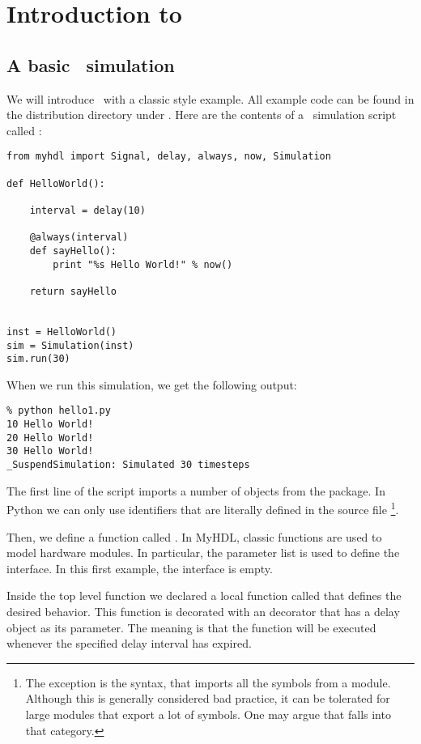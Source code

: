 \chapter{Introduction to \myhdl\ \label{intro}}

\section{A basic \myhdl\ simulation \label{intro-basic}}

We will introduce \myhdl\ with a classic  style
example. All example code can be found in the distribution directory
under .  Here are the contents of a \myhdl\
simulation script called :

\begin{verbatim}
from myhdl import Signal, delay, always, now, Simulation

def HelloWorld():

    interval = delay(10)
    
    @always(interval)
    def sayHello():
        print "%s Hello World!" % now()

    return sayHello


inst = HelloWorld()
sim = Simulation(inst)
sim.run(30)
\end{verbatim}

When we run this simulation, we get the following output:

\begin{verbatim}
% python hello1.py
10 Hello World!
20 Hello World!
30 Hello World!
_SuspendSimulation: Simulated 30 timesteps
\end{verbatim}

The first line of the script imports a number of objects from the
\code{myhdl} package. In Python we can only use identifiers that are
literally defined in the source file 
\footnote{The exception is the  syntax,
that imports all the symbols from a module. Although this is generally
considered bad practice, it can be tolerated for large modules that
export a lot of symbols. One may argue that
 falls into that category.}.

Then, we define a function called . In MyHDL,
classic functions are used to model hardware modules. In particular,
the parameter list is used to define the interface. In this first
example, the interface is empty.

Inside the top level function we declared a local function called
\function{sayHello} that defines the desired behavior. This function
is decorated with an \function{@always} decorator that has a delay
object as its parameter.  The meaning is that the function will be
executed whenever the specified delay interval has expired.

